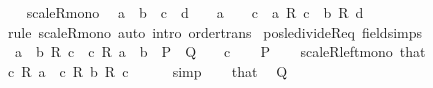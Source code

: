 \begin{isabellebody}
\ \ \isanewline
{}\isamarkupfalse%
\ scaleR{\isacharunderscore}{\kern0pt}mono{\isacharprime}{\kern0pt}{\isacharcolon}{\kern0pt}\isanewline
\ \ {\isachardoublequoteopen}a\ {\isasymle}\ b\ {\isasymLongrightarrow}\ c\ {\isasymle}\ d\ {\isasymLongrightarrow}\ {}\ {\isasymle}\ a\ {\isasymLongrightarrow}\ {}\ {\isasymle}\ c\ {\isasymLongrightarrow}\ a\ {\isacharasterisk}{\kern0pt}\isactrlsub R\ c\ {\isasymle}\ b\ {\isacharasterisk}{\kern0pt}\isactrlsub R\ d{\isachardoublequoteclose}\isanewline
%
\isadelimproof
\ \ %
\endisadelimproof
%
\isatagproof
{}\isamarkupfalse%
\ {\isacharparenleft}{\kern0pt}rule\ scaleR{\isacharunderscore}{\kern0pt}mono{\isacharparenright}{\kern0pt}\ {\isacharparenleft}{\kern0pt}auto\ intro{\isacharcolon}{\kern0pt}\ order{\isachardot}{\kern0pt}trans{\isacharparenright}{\kern0pt}%
\endisatagproof
{\isafoldproof}%
%
\isadelimproof
\isanewline
%
\endisadelimproof
\isanewline
{}\isamarkupfalse%
\ pos{\isacharunderscore}{\kern0pt}le{\isacharunderscore}{\kern0pt}divideR{\isacharunderscore}{\kern0pt}eq\ {\isacharbrackleft}{\kern0pt}field{\isacharunderscore}{\kern0pt}simps{\isacharbrackright}{\kern0pt}{\isacharcolon}{\kern0pt}\isanewline
\ \ {\isachardoublequoteopen}a\ {\isasymle}\ b\ {\isacharslash}{\kern0pt}\isactrlsub R\ c\ {\isasymlongleftrightarrow}\ c\ {\isacharasterisk}{\kern0pt}\isactrlsub R\ a\ {\isasymle}\ b{\isachardoublequoteclose}\ {\isacharparenleft}{\kern0pt}\ {\isachardoublequoteopen}{\isacharquery}{\kern0pt}P\ {\isasymlongleftrightarrow}\ {\isacharquery}{\kern0pt}Q{\isachardoublequoteclose}{\isacharparenright}{\kern0pt}\ \ {\isachardoublequoteopen}{}\ {\isacharless}{\kern0pt}\ c{\isachardoublequoteclose}\isanewline
%
\isadelimproof
%
\endisadelimproof
%
\isatagproof
{}\isamarkupfalse%
\isanewline
\ \ \isamarkupfalse%
\ {\isacharquery}{\kern0pt}P\isanewline
\ \ \isamarkupfalse%
\ scaleR{\isacharunderscore}{\kern0pt}left{\isacharunderscore}{\kern0pt}mono\ that\ \isamarkupfalse%
\ {\isachardoublequoteopen}c\ {\isacharasterisk}{\kern0pt}\isactrlsub R\ a\ {\isasymle}\ c\ {\isacharasterisk}{\kern0pt}\isactrlsub R\ {\isacharparenleft}{\kern0pt}b\ {\isacharslash}{\kern0pt}\isactrlsub R\ c{\isacharparenright}{\kern0pt}{\isachardoublequoteclose}\isanewline
\ \ \ \ \isamarkupfalse%
\ simp\isanewline
\ \ \isamarkupfalse%
\ that\ \isamarkupfalse%
\ {\isacharquery}{\kern0pt}Q\isanewline
\ \ \ \ \isamarkupfalse%

\end{isabellebody}
